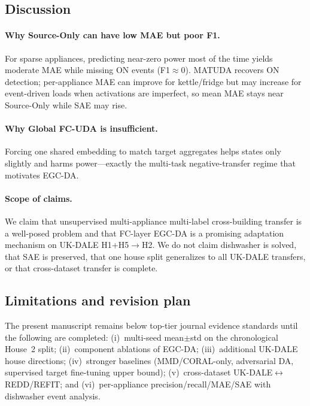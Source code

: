 \documentclass[journal]{IEEEtran}
\begin{document}
\subsection{Discussion}
\paragraph{Why Source-Only can have low MAE but poor F1.}
For sparse appliances, predicting near-zero power most of the time yields moderate MAE while missing ON events (F1$\approx 0$).
MATUDA recovers ON detection; per-appliance MAE can improve for kettle/fridge but may increase for event-driven loads when activations are imperfect, so mean MAE stays near Source-Only while SAE may rise.

\paragraph{Why Global FC-UDA is insufficient.}
Forcing one shared embedding to match target aggregates helps states only slightly and harms power---exactly the multi-task negative-transfer regime that motivates EGC-DA.

\paragraph{Scope of claims.}
We claim that unsupervised multi-appliance multi-label cross-building transfer is a well-posed problem and that FC-layer EGC-DA is a promising adaptation mechanism on UK-DALE H1+H5$\rightarrow$H2.
We do not claim dishwasher is solved, that SAE is preserved, that one house split generalizes to all UK-DALE transfers, or that cross-dataset transfer is complete.

\subsection{Limitations and revision plan}
The present manuscript remains below top-tier journal evidence standards until the following are completed: (i)~multi-seed mean$\pm$std on the chronological House~2 split; (ii)~component ablations of EGC-DA; (iii)~additional UK-DALE house directions; (iv)~stronger baselines (MMD/CORAL-only, adversarial DA, supervised target fine-tuning upper bound); (v)~cross-dataset UK-DALE$\leftrightarrow$REDD/REFIT; and (vi)~per-appliance precision/recall/MAE/SAE with dishwasher event analysis.

\end{document}
